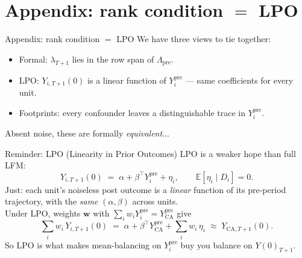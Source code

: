 \documentclass[handout,xcolor=dvipsnames,pdftex,hyperref={colorlinks=false}]{beamer}
\newcommand\makegaps{\addtolength{\itemsep}{.25\baselineskip}}
\newcommand\E{\mathbb{E}}
\newcommand{\mb}{\mathbf}
\newcommand{\Ypre}{Y^{\text{pre}}}        %
\newcommand{\ypre}{Y^{\text{pre}}_i}      %
\newcommand{\Lpre}{\Lambda_{\text{pre}}}  %
\newcommand{\Wco}{\mb{w}}                 %
\begin{document}

\appendix
\section*{Appendix: rank condition $=$ LPO}

\begin{frame}{Appendix: rank condition $=$ LPO}
\small
{} We have three views to tie together:
\begin{itemize}
  \item Formal: $\lambda_{T+1}$ lies in the row span of $\Lpre$.
  \item LPO: $Y_{i,T+1}(0)$ is a linear function of $\ypre$ --- same coefficients for every unit.
  \item Footprints: every confounder leaves a distinguishable trace in $\ypre$.
\end{itemize}
 Absent noise, these are formally \emph{equivalent}...
\end{frame}

\begin{frame}{Reminder: LPO (Linearity in Prior Outcomes)}
\small
LPO is a weaker hope than full LFM:
\[
Y_{i,T+1}(0) \;=\; \alpha + \beta^\top \ypre + \eta_i, \qquad \E[\eta_i \mid D_i] = 0.
\]
 Just: each unit's noiseless post outcome is a \emph{linear} function of its pre-period trajectory, with the \emph{same} $(\alpha, \beta)$ across units.\\[2ex]
 Under LPO, weights $\Wco$ with $\sum_i w_i \ypre = Y^{\text{pre}}_{\text{CA}}$ give
\[
\sum_i w_i\, Y_{i,T+1}(0) \;=\; \alpha + \beta^\top Y^{\text{pre}}_{\text{CA}} + \sum_i w_i\, \eta_i \;\approx\; Y_{\text{CA},T+1}(0).
\]
So LPO is what makes mean-balancing on $\ypre$ buy you balance on $Y(0)_{T+1}$.
\end{frame}
\end{document}
